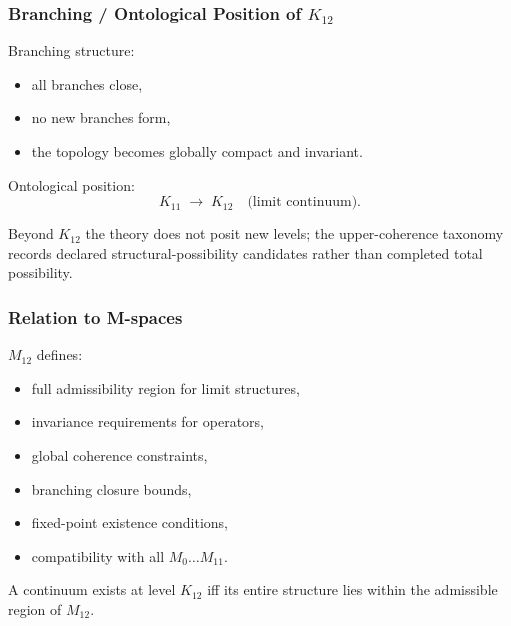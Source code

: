 \subsubsection{Branching / Ontological Position of $K_{12}$}

Branching structure:
\begin{itemize}
    \item all branches close,
    \item no new branches form,
    \item the topology becomes globally compact and invariant.
\end{itemize}

Ontological position:
\[
K_{11} \;\longrightarrow\; K_{12} \quad \text{(limit continuum)}.
\]

Beyond $K_{12}$ the theory does not posit new levels; the upper-coherence taxonomy records declared structural-possibility candidates rather than completed total possibility.

\subsubsection{Relation to M-spaces}

$M_{12}$ defines:
\begin{itemize}
    \item full admissibility region for limit structures,
    \item invariance requirements for operators,
    \item global coherence constraints,
    \item branching closure bounds,
    \item fixed-point existence conditions,
    \item compatibility with all $M_0\dots M_{11}$.
\end{itemize}

A continuum exists at level $K_{12}$ iff its entire structure lies within the
admissible region of $M_{12}$.
